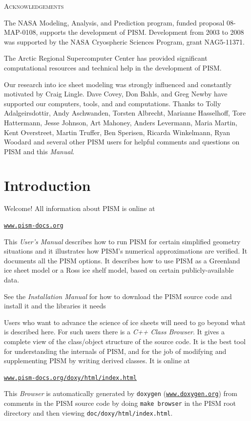 \documentclass[11pt,final]{amsart}
\renewcommand{\t}[1]{\texttt{#1}}
\begin{document}
\centerline{\textsc{Acknowledgements}}
\bigskip

The NASA Modeling, Analysis, and Prediction program, funded proposal 08-MAP-0108, supports the development of PISM.  Development from 2003 to 2008 was supported by the NASA Cryospheric Sciences Program, grant NAG5-11371.

The Arctic Regional Supercomputer Center has provided significant computational resources and technical help in the development of PISM.

Our research into ice sheet modeling was strongly influenced and constantly motivated by Craig Lingle.  Dave Covey, Don Bahls, and Greg Newby have supported our computers, tools, and and computations.  Thanks to Tolly Adalgeirsdottir, Andy Aschwanden, Torsten Albrecht, Marianne Hasselhoff, Tore Hattermann, Jesse Johnson, Art Mahoney, Anders Levermann, Maria Martin, Kent Overstreet, Martin Truffer, Ben Sperisen, Ricarda Winkelmann, Ryan Woodard and several other PISM users for helpful comments and questions on PISM and this \emph{Manual}.

\newpage
\setcounter{tocdepth}{2}
\small
\tableofcontents
\normalsize

\newpage
\section{Introduction}\label{sect:intro}

Welcome!  All information about PISM is online at
\begin{center}
  \href{http://www.pism-docs.org}{\t{www.pism-docs.org}}
\end{center}

This \emph{User's Manual} describes how to run PISM for certain simplified geometry situations and it illustrates how PISM's numerical approximations are verified.  It documents all the PISM options.  It describes how to use PISM as a Greenland ice sheet model or a Ross ice shelf model, based on certain publicly-available data.

See the \emph{Installation Manual} for how to download the PISM source code and install it and the libraries it needs

Users who want to advance the science of ice sheets will need to go beyond what is described here.  For such users there is a \emph{C++ Class Browser}.  It gives a complete view of the class/object structure of the source code.  It is the best tool for understanding the internals of PISM, and for the job of modifying and supplementing PISM by writing derived classes.  It is online at
   \begin{center}
     \href{http://www.pism-docs.org/doxy/html/index.html}{\t{www.pism-docs.org/doxy/html/index.html}}
   \end{center}
This \emph{Browser} is automatically generated by \verb|doxygen| (\href{http://www.doxygen.org/}{\t{www.doxygen.org}}) from comments in the PISM source code by doing \verb|make browser| in the PISM root directory and then viewing \verb|doc/doxy/html/index.html|.  
\end{document}
